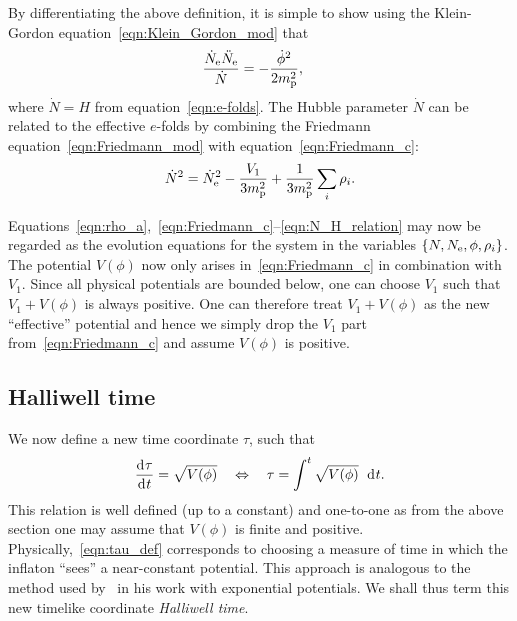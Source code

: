 By differentiating the above definition, it is simple to show using the Klein-Gordon equation~\eqref{eqn:Klein_Gordon_mod} that
%
\begin{align}
  \frac{\dot{N}_\mathrm{e} \ddot{N}_\mathrm{e}}{\dot{N}}  
  &=
  -\frac{\dot{\phi}^2}{2m_{\mathrm{p}}^2},
  \label{eqn:Raychaudhuri_c}
\end{align}
%
where $\dot{N}=H$ from equation~\eqref{eqn:e-folds}. The Hubble parameter $\dot{N}$ can be related to the effective $e$-folds by combining the Friedmann equation~\eqref{eqn:Friedmann_mod} with equation~\eqref{eqn:Friedmann_c}:
%
\begin{equation}
  \dot{N}^2 = \dot{N}_\mathrm{e}^2 -\frac{V_1}{3m_{\mathrm{p}}^2} + \frac{1}{3m_{\mathrm{p}}^2}\sum_i\rho_i.
  \label{eqn:N_H_relation}
\end{equation}
%

Equations~\eqref{eqn:rho_a},~\eqref{eqn:Friedmann_c}--\eqref{eqn:N_H_relation} may now be regarded as the evolution equations for the system in the variables $\{N,N_\mathrm{e},\phi,\rho_i\}$.  The potential $V(\phi)$ now only arises in~\eqref{eqn:Friedmann_c} in combination with $V_1$.  Since all physical potentials are bounded below, one can choose $V_1$ such that $V_1+V(\phi)$ is always positive. One can therefore treat $V_1+V(\phi)$ as the new ``effective'' potential and hence we simply drop the $V_1$ part from~\eqref{eqn:Friedmann_c} and assume $V(\phi)$ is positive.

\subsection{Halliwell time}
%
We now define a new time coordinate $\tau$, such that
%
\begin{equation}
  \frac{\operatorname{d}^{}\!{\tau}}{\operatorname{d}^{}\!{t}} 
  = 
  \sqrt{V(\phi)} \quad\Leftrightarrow\quad \tau 
  = 
  \int^t \sqrt{V(\phi)}\:\: \operatorname{d}^{}\!{t}.
  \label{eqn:tau_def}
\end{equation}
%
This relation is well defined (up to a constant) and one-to-one as from the above section one may assume that $V(\phi)$ is finite and positive. Physically,~\eqref{eqn:tau_def} corresponds to choosing a measure of time in which the inflaton ``sees'' a near-constant potential. This approach is analogous to the method used by~\citet{halliwell_scalar_1987} in his work with exponential potentials. We shall thus term this new timelike coordinate {\em Halliwell time}.

